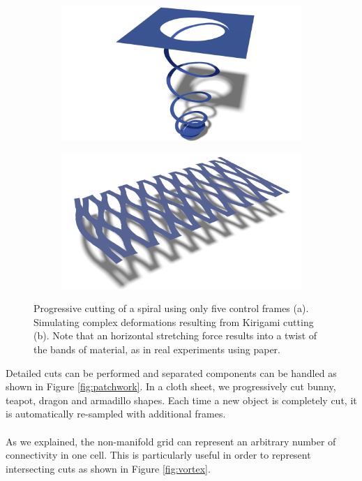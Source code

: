 \begin{figure}[!h]
	\centering
	\begin{subfigure}[b]{0.45\linewidth}
		\includegraphics[width=\linewidth]{images/cutting-mig2015/Spiral2.pdf}
		\caption{\label{fig:spiral}}
	\end{subfigure}
	\hfill
	\begin{subfigure}[b]{0.45\linewidth}
		\includegraphics[width=\linewidth]{images/cutting-mig2015/Kirigami.pdf}
		\caption{\label{fig:kirigami}}
	\end{subfigure}
	\caption[Frame-based cutting: Spiral and Kirigami cutting examples]{\label{fig:Cutting_Teaser} Progressive cutting of a spiral using only five control frames (a). Simulating complex deformations resulting from Kirigami cutting (b). Note that an horizontal stretching force results into a twist of the bands of material, as in real experiments using paper.}
\end{figure}

Detailed cuts can be performed and separated components can be handled as shown in Figure \ref{fig:patchwork}. In a cloth sheet, we progressively cut bunny, teapot, dragon and armadillo shapes. Each time a new object is completely cut, it is automatically re-sampled with additional frames.
\\ \\
As we explained, the non-manifold grid can represent an arbitrary number of connectivity in one cell. This is particularly useful in order to represent intersecting cuts as shown in Figure \ref{fig:vortex}.


